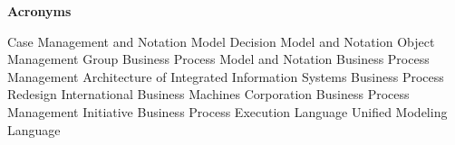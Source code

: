 \clearemptydoublepage
{}
{}	




\vspace*{2cm}

\begin{center}
{\Large \bf Acronyms}
\end{center}
\vspace{1cm}

\begin{acronym}
 {Case Management and Notation Model}
 {Decision Model and Notation}
 {Object Management Group}
 {Business Process Model and Notation}
 {Business Process Management}
 {Architecture of Integrated Information Systems}
 {Business Process Redesign} 
 {International Business Machines Corporation}
 {Business Process Management Initiative}
 {Business Process Execution Language}
 {Unified Modeling Language}
\end{acronym}
